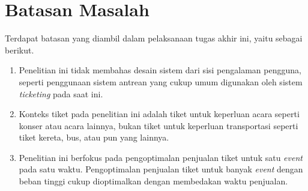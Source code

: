 \section{Batasan Masalah}
\label{sec:batasan-masalah}

Terdapat batasan yang diambil dalam pelaksanaan tugas akhir ini, yaitu sebagai berikut.

\begin{enumerate}
  \item Penelitian ini tidak membahas desain sistem dari sisi pengalaman pengguna, seperti penggunaan sistem antrean yang cukup umum digunakan oleh sistem \textit{ticketing} pada saat ini.
  \item Konteks tiket pada penelitian ini adalah tiket untuk keperluan acara seperti konser atau acara lainnya, bukan tiket untuk keperluan transportasi seperti tiket kereta, bus, atau pun yang lainnya.
  \item Penelitian ini berfokus pada pengoptimalan penjualan tiket untuk satu \textit{event} pada satu waktu. Pengoptimalan penjualan tiket untuk banyak \textit{event} dengan beban tinggi cukup dioptimalkan dengan membedakan waktu penjualan.
\end{enumerate}

